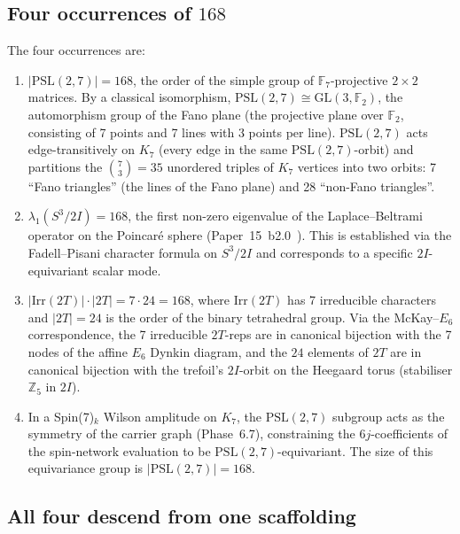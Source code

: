 \documentclass[11pt]{article}
\newcommand{\Z}{\mathbb{Z}}
\newcommand{\F}{\mathbb{F}}
\newcommand{\PSL}{\mathrm{PSL}}
\newcommand{\GL}{\mathrm{GL}}
\begin{document}
\subsection{Four occurrences of $168$}

The four occurrences are:
\begin{enumerate}
\item $|\PSL(2, 7)| = 168$, the order of the simple group of
  $\F_7$-projective $2 \times 2$ matrices.  By a classical
  isomorphism, $\PSL(2,7) \cong \GL(3, \F_2)$, the automorphism
  group of the Fano plane (the projective plane over $\F_2$,
  consisting of 7 points and 7 lines with 3 points per line).
  $\PSL(2,7)$ acts edge-transitively on $K_7$ (every edge in the
  same $\PSL(2,7)$-orbit) and partitions the
  $\binom{7}{3} = 35$ unordered triples of $K_7$ vertices into
  two orbits: 7 ``Fano triangles'' (the lines of the Fano plane)
  and 28 ``non-Fano triangles''.
\item $\lambda_1(S^3/2I) = 168$, the first non-zero eigenvalue of
  the Laplace--Beltrami operator on the Poincar\'e sphere
  (Paper~15~b2.0~\cite{paper15}).  This is established via the
  Fadell--Pisani character formula on $S^3/2I$ and corresponds to
  a specific $2I$-equivariant scalar mode.
\item $|\mathrm{Irr}(2T)| \cdot |2T| = 7 \cdot 24 = 168$, where
  $\mathrm{Irr}(2T)$ has 7 irreducible characters and $|2T| = 24$
  is the order of the binary tetrahedral group.  Via the
  McKay--$E_6$ correspondence, the 7 irreducible $2T$-reps are
  in canonical bijection with the 7 nodes of the affine $E_6$
  Dynkin diagram, and the $24$ elements of $2T$ are in canonical
  bijection with the trefoil's $2I$-orbit on the Heegaard torus
  (stabiliser $\Z_5$ in $2I$).
\item In a Spin(7)$_k$ Wilson amplitude on $K_7$, the
  $\PSL(2, 7)$ subgroup acts as the symmetry of the carrier graph
  (Phase~6.7), constraining the 6$j$-coefficients of the spin-network
  evaluation to be $\PSL(2,7)$-equivariant.  The size of this
  equivariance group is $|\PSL(2,7)| = 168$.
\end{enumerate}

\subsection{All four descend from one scaffolding}
\end{document}
